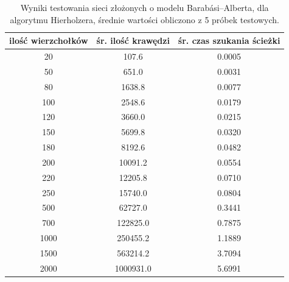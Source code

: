 \documentclass[a4paper, 12pt, twoside, openright]{article}
\begin{document}
\begin{table}[!p]
	\centering
	\caption{Wyniki testowania sieci złożonych o modelu Barabási–Alberta, dla algorytmu Hierholzera, średnie wartości obliczono z 5 próbek testowych.}
	
	\resizebox{16cm}{!}
	{
		\begin{tabular}{|c c c|}
			\hline
			ilość wierzchołków	& śr. ilość krawędzi 		& śr. czas szukania ścieżki \\ \hline \hline
			20 	& 107.6 		& 0.0005 	\\ \hline
			50 	& 651.0 		& 0.0031 	\\ \hline
			80 	& 1638.8        & 0.0077	\\ \hline
			100 & 2548.6        & 0.0179	\\ \hline
			120 & 3660.0        & 0.0215	\\ \hline
			150 & 5699.8   		& 0.0320	\\ \hline
			180 & 8192.6        & 0.0482	\\ \hline
			200 & 10091.2 		& 0.0554	\\ \hline
			220 & 12205.8 		& 0.0710	\\ \hline
			250 & 15740.0 		& 0.0804	\\ \hline
			500 & 62727.0 		& 0.3441	\\ \hline				
			700 & 122825.0      & 0.7875	\\ \hline
			1000& 250455.2	    & 1.1889 	\\ \hline
			1500& 563214.2	    & 3.7094 	\\ \hline
			2000& 1000931.0    	& 5.6991	\\ \hline
		\end{tabular} 
	}
	\label{Tab:Hie_BA}
\end{table}
\end{document}
